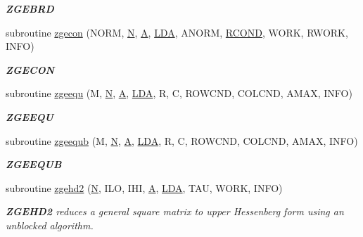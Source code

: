 \begin{DoxyCompactItemize}
\begin{DoxyCompactList}\small\item\em {\bfseries Z\+G\+E\+B\+R\+D} \end{DoxyCompactList}\item 
subroutine \hyperlink{group__complex16GEcomputational_gabe73145daeba3ec10e961054b75a07ce}{zgecon} (N\+O\+R\+M, \hyperlink{polmisc_8c_a0240ac851181b84ac374872dc5434ee4}{N}, \hyperlink{classA}{A}, \hyperlink{example__user_8c_ae946da542ce0db94dced19b2ecefd1aa}{L\+D\+A}, A\+N\+O\+R\+M, \hyperlink{superlu__enum__consts_8h_af00a42ecad444bbda75cde1b64bd7e72a9b5c151728d8512307565994c89919d5}{R\+C\+O\+N\+D}, W\+O\+R\+K, R\+W\+O\+R\+K, I\+N\+F\+O)
\begin{DoxyCompactList}\small\item\em {\bfseries Z\+G\+E\+C\+O\+N} \end{DoxyCompactList}\item 
subroutine \hyperlink{group__complex16GEcomputational_ga6f32d90ac16974bf09e92b049b35c0c7}{zgeequ} (M, \hyperlink{polmisc_8c_a0240ac851181b84ac374872dc5434ee4}{N}, \hyperlink{classA}{A}, \hyperlink{example__user_8c_ae946da542ce0db94dced19b2ecefd1aa}{L\+D\+A}, R, C, R\+O\+W\+C\+N\+D, C\+O\+L\+C\+N\+D, A\+M\+A\+X, I\+N\+F\+O)
\begin{DoxyCompactList}\small\item\em {\bfseries Z\+G\+E\+E\+Q\+U} \end{DoxyCompactList}\item 
subroutine \hyperlink{group__complex16GEcomputational_ga3149551bfd0d41e7e8125a2d26d6c017}{zgeequb} (M, \hyperlink{polmisc_8c_a0240ac851181b84ac374872dc5434ee4}{N}, \hyperlink{classA}{A}, \hyperlink{example__user_8c_ae946da542ce0db94dced19b2ecefd1aa}{L\+D\+A}, R, C, R\+O\+W\+C\+N\+D, C\+O\+L\+C\+N\+D, A\+M\+A\+X, I\+N\+F\+O)
\begin{DoxyCompactList}\small\item\em {\bfseries Z\+G\+E\+E\+Q\+U\+B} \end{DoxyCompactList}\item 
subroutine \hyperlink{group__complex16GEcomputational_ga8a81f8f7aca961fb59ef5b57256a5f68}{zgehd2} (\hyperlink{polmisc_8c_a0240ac851181b84ac374872dc5434ee4}{N}, I\+L\+O, I\+H\+I, \hyperlink{classA}{A}, \hyperlink{example__user_8c_ae946da542ce0db94dced19b2ecefd1aa}{L\+D\+A}, T\+A\+U, W\+O\+R\+K, I\+N\+F\+O)
\begin{DoxyCompactList}\small\item\em {\bfseries Z\+G\+E\+H\+D2} reduces a general square matrix to upper Hessenberg form using an unblocked algorithm. \end{DoxyCompactList}\item 

\end{DoxyCompactItemize}
